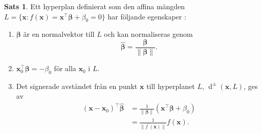 \documentclass[a4paper, 12pt]{report}
\theoremstyle{definition}
\newtheorem{thm}{Sats}[section]
\theoremstyle{remark}
\newcommand{\bfbeta}{{\boldsymbol{\beta}}}
\newcommand{\sephyp}{\{ \mathbf{x} : f(\mathbf{x})=\mathbf{x}^\intercal \bfbeta + \beta_0=0\}}
\begin{document}
\begin{thm}\label{thm:hyperplan}
	Ett hyperplan definierat som den affina mängden $L=\sephyp$ har följande egenskaper \cite{ESL}:
	\begin{enumerate}
		\item $\bfbeta$ är en normalvektor till $L$ och kan normaliseras genom
		\begin{equation*}
			\widehat{\bfbeta} = \frac{\bfbeta}{\|\bfbeta\|}.
		\end{equation*}
		\item $\mathbf{x}_0^\intercal \bfbeta = -\beta_0$ för alla $\mathbf{x}_0$ i $L$.
		\item Det signerade avståndet från en punkt $\mathbf{x}$ till hyperplanet $L$, $\operatorname{d}^\pm (\mathbf{x}, L)$, ges av
		\begin{equation*}
		\begin{aligned}
			(\mathbf{x}-\mathbf{x}_0)^\intercal \widehat{\bfbeta} &= \frac{1}{\|\bfbeta\|}(\mathbf{x}^\intercal \bfbeta+\beta_0)\\
			&= \frac{1}{\|f^\prime(\mathbf{x})\|}f(\mathbf{x}).
		\end{aligned}
		\end{equation*}
	\end{enumerate}
\end{thm}
\end{document}
